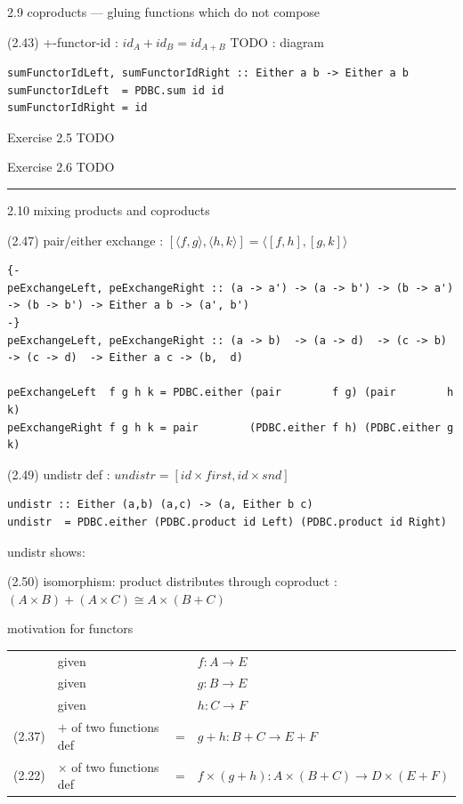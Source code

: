 \documentclass[presentation]{beamer}
\begin{document}
\begin{frame}[fragile,label=sec-8]{2.9 coproducts --- gluing functions which do not compose}
\begin{block}{(2.43) $+$-functor-id : $id_A + id_B = id_{A+B}$}
TODO : diagram

\begin{verbatim}
sumFunctorIdLeft, sumFunctorIdRight :: Either a b -> Either a b
sumFunctorIdLeft  = PDBC.sum id id
sumFunctorIdRight = id
\end{verbatim}

\alert{Exercise 2.5}  TODO

\alert{Exercise 2.6}  TODO

\rule{\linewidth}{0.5pt}
\end{block}
\end{frame}
\begin{frame}[fragile,label=sec-9]{2.10 mixing products and coproducts}
 \begin{block}{(2.47) pair/either exchange : $[ \langle f , g \rangle , \langle h , k \rangle ] = \langle [ f , h ], [ g , k ] \rangle$}
\begin{verbatim}
{-
peExchangeLeft, peExchangeRight :: (a -> a') -> (a -> b') -> (b -> a') -> (b -> b') -> Either a b -> (a', b')
-}
peExchangeLeft, peExchangeRight :: (a -> b)  -> (a -> d)  -> (c -> b)  -> (c -> d)  -> Either a c -> (b,  d)

peExchangeLeft  f g h k = PDBC.either (pair        f g) (pair        h k)
peExchangeRight f g h k = pair        (PDBC.either f h) (PDBC.either g k)
\end{verbatim}
\end{block}

\begin{block}{(2.49) undistr def : $undistr = [ id \times first , id \times snd ]$}
\begin{verbatim}
undistr :: Either (a,b) (a,c) -> (a, Either b c)
undistr  = PDBC.either (PDBC.product id Left) (PDBC.product id Right)
\end{verbatim}

undistr shows:
\end{block}

\begin{block}{(2.50) isomorphism: product distributes through coproduct : $(A \times B) + (A \times C) \cong A \times (B + C)$}
\end{block}

\begin{block}{motivation for functors}
\begin{center}
\begin{tabular}{llll}
 & given &  & $f : A \rightarrow E$\\
 & given &  & $g : B \rightarrow E$\\
 & given &  & $h : C \rightarrow F$\\
(2.37) & $+$ of two functions def & = & $g + h : B + C \rightarrow E + F$\\
(2.22) & $\times$ of two functions def & = & $f \times (g + h) : A \times (B + C) \rightarrow D \times (E + F)$\\
\end{tabular}
\end{center}


\end{block}
\end{frame}
\end{document}
